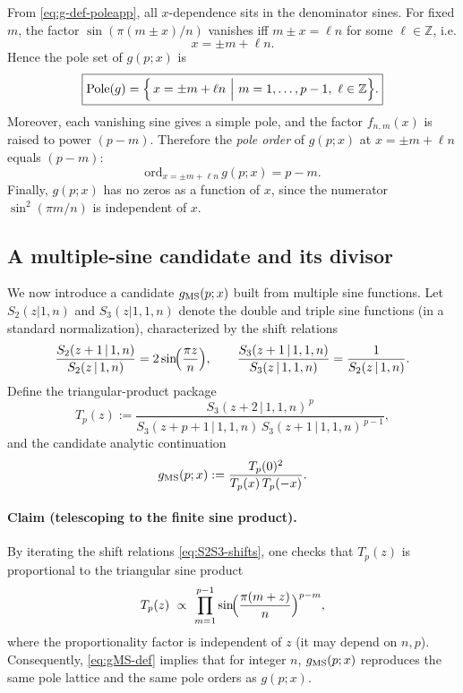 \documentclass[11pt]{article}
\begin{document}
  From \eqref{eq:g-def-poleapp}, all $x$-dependence sits in the denominator
  sines. For fixed $m$, the factor $\sin(\pi(m\pm x)/n)$ vanishes iff
  $m\pm x=\ell n$ for some $\ell\in\mathbb{Z}$, i.e.
  \begin{equation}
    x=\pm m+\ell n.
  \end{equation}
  Hence the pole set of $g(p;x)$ is
  \begin{equation}
    \boxed{ \mathrm{Pole}(g)=\Bigl\{\,x=\pm m+\ell n\ \Big|\ m=1,\dots,p-1,\ \ell\in\mathbb{Z}\Bigr\}. }
  \end{equation}
  Moreover, each vanishing sine gives a simple pole, and the factor $f_{n,m}(x)$
  is raised to power $(p-m)$. Therefore the \emph{pole order} of $g(p;x)$ at
  $x=\pm m+\ell n$ equals $(p-m)$:
  \begin{equation}
    \boxed{ \mathrm{ord}_{x=\pm m+\ell n}\, g(p;x)=p-m. }
  \end{equation}
  Finally, $g(p;x)$ has no zeros as a function of $x$, since the numerator $\sin^{2}
  (\pi m/n)$ is independent of $x$.

  \subsection*{A multiple-sine candidate and its divisor}

  We now introduce a candidate $g_{\rm MS}(p;x)$ built from multiple sine
  functions. Let $S_{2}(z|1,n)$ and $S_{3}(z|1,1,n)$ denote the double and triple
  sine functions (in a standard normalization), characterized by the shift
  relations
  \begin{equation}
    \frac{S_{2}(z+1\,|\,1,n)}{S_{2}(z\,|\,1,n)}=2\sin\!\Bigl(\frac{\pi z}{n}\Bigr
    ), \qquad \frac{S_{3}(z+1\,|\,1,1,n)}{S_{3}(z\,|\,1,1,n)}=\frac{1}{S_{2}(z\,|\,1,n)}
    . \label{eq:S2S3-shifts}
  \end{equation}
  Define the triangular-product package
  \begin{equation}
    T_{p}(z):= \frac{S_{3}(z+2\,|\,1,1,n)^{\,p}}{S_{3}(z+p+1\,|\,1,1,n)\,S_{3}(z+1\,|\,1,1,n)^{\,p-1}}
    , \label{eq:T-def}
  \end{equation}
  and the candidate analytic continuation
  \begin{equation}
    g_{\rm MS}(p;x):=\frac{T_{p}(0)^{2}}{T_{p}(x)\,T_{p}(-x)}. \label{eq:gMS-def}
  \end{equation}

  \paragraph{Claim (telescoping to the finite sine product).}
  By iterating the shift relations \eqref{eq:S2S3-shifts}, one checks that
  $T_{p}(z)$ is proportional to the triangular sine product
  \begin{equation}
    T_{p}(z)\ \propto\ \prod_{m=1}^{p-1}\sin\!\Bigl(\frac{\pi(m+z)}{n}\Bigr)^{p-m}
    , \label{eq:T-telescope}
  \end{equation}
  where the proportionality factor is independent of $z$ (it may depend on $n,p$).
  Consequently, \eqref{eq:gMS-def} implies that for integer $n$,
  $g_{\rm MS}(p;x)$ reproduces the same pole lattice and the same pole orders as
  $g(p;x)$.
\end{document}
